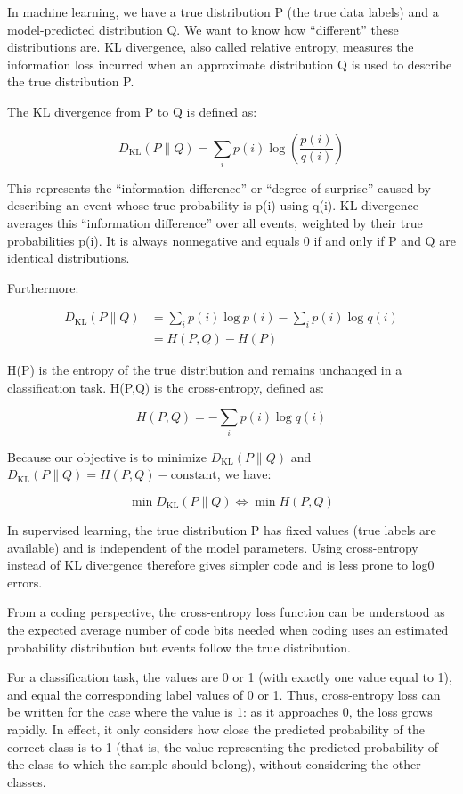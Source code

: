 In machine learning, we have a true distribution P (the true data labels) and a model-predicted distribution Q. We want to know how ``different'' these distributions are. KL divergence, also called relative entropy, measures the information loss incurred when an approximate distribution Q is used to describe the true distribution P.

The KL divergence from P to Q is defined as:

\[
D_{\mathrm{KL}}(P \parallel Q)=\sum_i p(i)\log\left(\frac{p(i)}{q(i)}\right)
\]

This represents the ``information difference'' or ``degree of surprise'' caused by describing an event whose true probability is p(i) using q(i). KL divergence averages this ``information difference'' over all events, weighted by their true probabilities p(i). It is always nonnegative and equals 0 if and only if P and Q are identical distributions.

Furthermore:

\[
\begin{aligned}
D_{\mathrm{KL}}(P \parallel Q)
&=\sum_i p(i)\log p(i)-\sum_i p(i)\log q(i)\\
&=H(P,Q)-H(P)
\end{aligned}
\]

H(P) is the entropy of the true distribution and remains unchanged in a classification task. H(P,Q) is the cross-entropy, defined as:

\[
H(P,Q)=-\sum_i p(i)\log q(i)
\]

Because our objective is to minimize \(D_{\mathrm{KL}}(P\parallel Q)\) and \(D_{\mathrm{KL}}(P\parallel Q)=H(P,Q)-\text{constant}\), we have:

\[
\min D_{\mathrm{KL}}(P\parallel Q)\Longleftrightarrow \min H(P,Q)
\]

In supervised learning, the true distribution P has fixed values (true labels are available) and is independent of the model parameters. Using cross-entropy instead of KL divergence therefore gives simpler code and is less prone to log0 errors.

From a coding perspective, the cross-entropy loss function can be understood as the expected average number of code bits needed when coding uses an estimated probability distribution but events follow the true distribution.

For a classification task, the values are 0 or 1 (with exactly one value equal to 1), and equal the corresponding label values of 0 or 1. Thus, cross-entropy loss can be written for the case where the value is 1: as it approaches 0, the loss grows rapidly. In effect, it only considers how close the predicted probability of the correct class is to 1 (that is, the value representing the predicted probability of the class to which the sample should belong), without considering the other classes.

